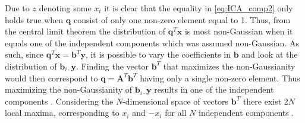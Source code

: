 Due to $z$ denoting some $x_i$ it is clear that the equality in \eqref{eq:ICA_comp2} only holds true when $\mathbf{q}$ consist of only one non-zero element equal to 1.  
Thus, from the central limit theorem the distribution of $\mathbf{q}^T \mathbf{x}$ is most non-Gaussian when it equals one of the independent components which was assumed non-Gaussian. 
As such, since $\mathbf{q}^T \mathbf{x} = \mathbf{b}^{T} \mathbf{y}$, it is possible to vary the coefficients in $\mathbf{b}$ and look at the distribution of $\mathbf{b}_{i \cdot} \mathbf{y}$. 
Finding the vector $\mathbf{b}^T$ that maximizes the non-Gaussianity would then correspond to $\mathbf{q} = \mathbf{A}^T \mathbf{b}^T$ having only a single non-zero element. 
Thus maximizing the non-Gaussianity of $\mathbf{b}_{i \cdot} \mathbf{y}$ results in one of the independent components \cite[p. 166]{ICA}. 
Considering the $N$-dimensional space of vectors $\mathbf{b}^T$ there exist $2N$ local maxima, corresponding to $x_i$ and $-x_i$ for all $N$ independent components \cite[p. 166]{ICA}. 

